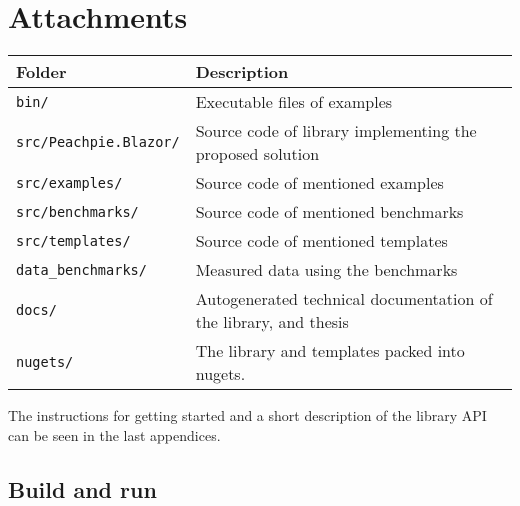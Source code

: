 \chapter{Attachments}

\begin{table}[H]
\centering
\begin{tabular}{ | m{11em} | m{22em}| } 
\hline
Folder & Description \\
\hline
\texttt{bin/} & Executable files of examples \\
\texttt{src/Peachpie.Blazor/} & Source code of library implementing the proposed solution \\
\texttt{src/examples/} & Source code of mentioned examples \\
\texttt{src/benchmarks/} & Source code of mentioned benchmarks \\
\texttt{src/templates/} & Source code of mentioned templates \\
\texttt{data\_benchmarks/} & Measured data using the benchmarks \\
\texttt{docs/} & Autogenerated technical documentation of the library, and thesis \\
\texttt{nugets/} & The library and templates packed into nugets. \\
\hline
\end{tabular}
\end{table}

The instructions for getting started and a short description of the library API can be seen in the last appendices.

\section{Build and run}

